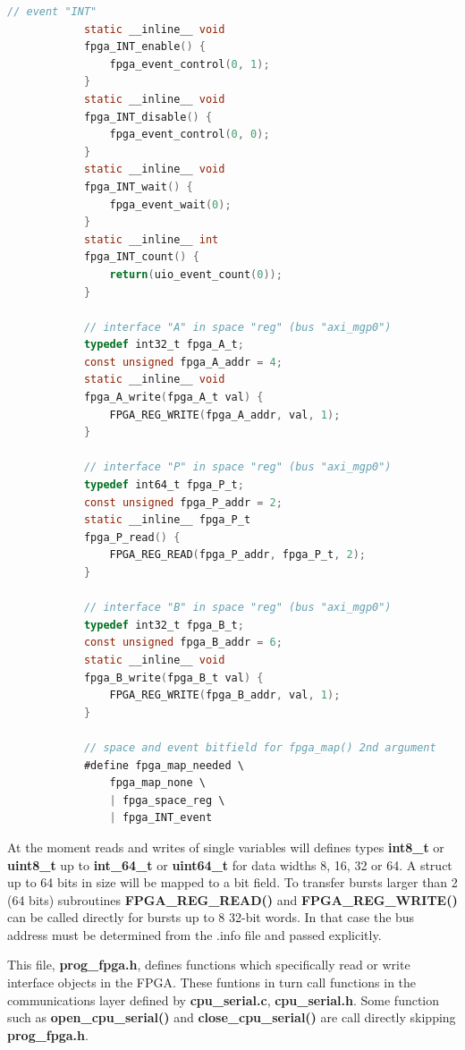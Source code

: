         \begin{lstlisting}[gobble=4, language=C]
            // event "INT"
            static __inline__ void
            fpga_INT_enable() {
                fpga_event_control(0, 1);
            }
            static __inline__ void
            fpga_INT_disable() {
                fpga_event_control(0, 0);
            }
            static __inline__ void
            fpga_INT_wait() {
                fpga_event_wait(0);
            }
            static __inline__ int
            fpga_INT_count() {
                return(uio_event_count(0));
            }

            // interface "A" in space "reg" (bus "axi_mgp0")
            typedef int32_t fpga_A_t;
            const unsigned fpga_A_addr = 4;
            static __inline__ void
            fpga_A_write(fpga_A_t val) {
                FPGA_REG_WRITE(fpga_A_addr, val, 1);
            }

            // interface "P" in space "reg" (bus "axi_mgp0")
            typedef int64_t fpga_P_t;
            const unsigned fpga_P_addr = 2;
            static __inline__ fpga_P_t
            fpga_P_read() {
                FPGA_REG_READ(fpga_P_addr, fpga_P_t, 2);
            }

            // interface "B" in space "reg" (bus "axi_mgp0")
            typedef int32_t fpga_B_t;
            const unsigned fpga_B_addr = 6;
            static __inline__ void
            fpga_B_write(fpga_B_t val) {
                FPGA_REG_WRITE(fpga_B_addr, val, 1);
            }

            // space and event bitfield for fpga_map() 2nd argument
            #define fpga_map_needed \
                fpga_map_none \
                | fpga_space_reg \
                | fpga_INT_event
        \end{lstlisting}

        At the moment reads and writes of single variables will defines types
        {\bf int8\_t} or {\bf uint8\_t} up to {\bf int\_64\_t} or {\bf uint64\_t}
        for data widths 8, 16, 32 or 64. A struct up to 64 bits in size will be
        mapped to a bit field. To transfer bursts larger than 2 (64 bits) subroutines
        {\bf FPGA\_REG\_READ()} and {\bf FPGA\_REG\_WRITE()} can be called directly
        for bursts up to 8 32-bit words. In that case the bus address must be determined
        from the .info file and passed explicitly.
        
        This file, {\bf prog\_fpga.h}, defines functions which specifically read or
        write interface objects in the FPGA. These funtions in turn call
        functions in the communications layer defined by {\bf cpu\_serial.c},
        {\bf cpu\_serial.h}. Some function such as {\bf open\_cpu\_serial()} and
        {\bf close\_cpu\_serial()} are call directly skipping {\bf prog\_fpga.h}.
        

